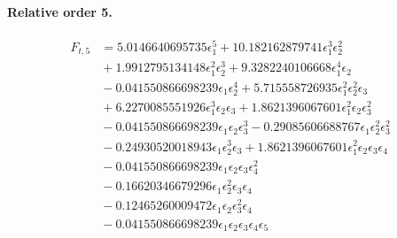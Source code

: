 \documentclass[10pt]{article}
\begin{document}
\paragraph{Relative order 5.}
\begin{align*}
F_{t,5} &= 5.0146640695735 \epsilon_{1}^{5} + 10.182162879741 \epsilon_{1}^{3} \epsilon_{2}^{2} \\
&{}  + 1.9912795134148 \epsilon_{1}^{2} \epsilon_{2}^{3} + 9.3282240106668 \epsilon_{1}^{4} \epsilon_{2} \\
&{}  - 0.041550866698239 \epsilon_{1} \epsilon_{2}^{4} + 5.715558726935 \epsilon_{1}^{2} \epsilon_{2}^{2} \epsilon_{3} \\
&{}  + 6.2270085551926 \epsilon_{1}^{3} \epsilon_{2} \epsilon_{3} + 1.8621396067601 \epsilon_{1}^{2} \epsilon_{2} \epsilon_{3}^{2} \\
&{}  - 0.041550866698239 \epsilon_{1} \epsilon_{2} \epsilon_{3}^{3} - 0.29085606688767 \epsilon_{1} \epsilon_{2}^{2} \epsilon_{3}^{2} \\
&{}  - 0.24930520018943 \epsilon_{1} \epsilon_{2}^{3} \epsilon_{3} + 1.8621396067601 \epsilon_{1}^{2} \epsilon_{2} \epsilon_{3} \epsilon_{4} \\
&{}  - 0.041550866698239 \epsilon_{1} \epsilon_{2} \epsilon_{3} \epsilon_{4}^{2} \\
&{}  - 0.16620346679296 \epsilon_{1} \epsilon_{2}^{2} \epsilon_{3} \epsilon_{4} \\
&{}  - 0.12465260009472 \epsilon_{1} \epsilon_{2} \epsilon_{3}^{2} \epsilon_{4} \\
&{}  - 0.041550866698239 \epsilon_{1} \epsilon_{2} \epsilon_{3} \epsilon_{4} \epsilon_{5}
\end{align*}
\end{document}
